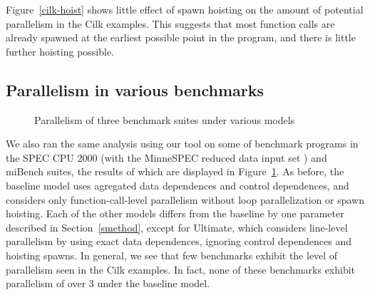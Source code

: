 Figure~\ref{cilk-hoist} shows little effect of spawn hoisting on the amount of potential parallelism in the Cilk examples.
This suggests that most function calls are already spawned at the earliest possible point in the program, and there is little further hoisting possible.

\subsection{Parallelism in various benchmarks}

\begin{figure}
 \centering

\caption{Parallelism of three benchmark suites under various models}
\label{benchmarks}
\end{figure}

We also ran the same analysis using our tool on some of benchmark programs in the SPEC CPU 2000 (with the MinneSPEC reduced data input set \cite{KleinOsowski02minnespec}) and miBench suites, the results of which are displayed in Figure~\ref{benchmarks}.
As before, the baseline model uses agregated data dependences and control dependences, and considers only function-call-level parallelism without loop parallelization or spawn hoisting.
Each of the other models differs from the baseline by one parameter described in Section~\ref{smethod}, except for Ultimate, which considers line-level parallelism by using exact data dependences, ignoring control dependences and hoisting spawns.
In general, we see that few benchmarks exhibit the level of parallelism seen in the Cilk examples.
In fact, none of these benchmarks exhibit parallelism of over 3 under the baseline model.

